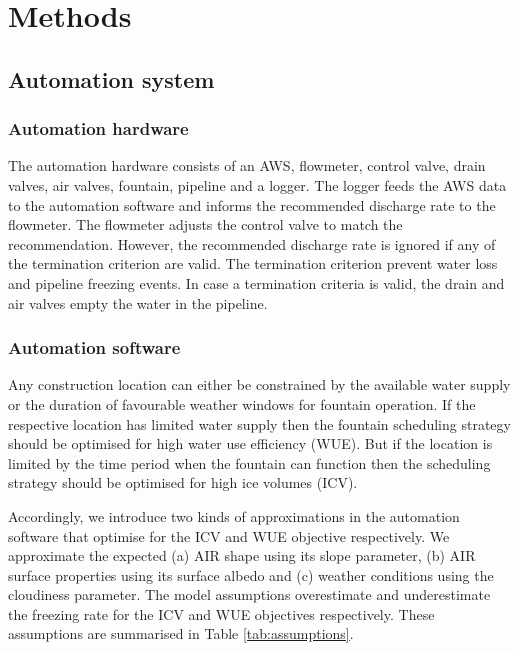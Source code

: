 \documentclass[tc, manuscript]{copernicus}
\begin{document}
\section{Methods}

\subsection{Automation system}

\subsubsection{Automation hardware}

The automation hardware consists of an AWS, flowmeter, control valve, drain valves, air valves, fountain,
pipeline and a logger. The logger feeds the AWS data to the automation software and informs the recommended
discharge rate to the flowmeter. The flowmeter adjusts the control valve to match the recommendation. However,
the recommended discharge rate is ignored if any of the termination criterion are valid. The termination
criterion prevent water loss and pipeline freezing events. In case a termination criteria is valid, the drain
and air valves empty the water in the pipeline.

\subsubsection{Automation software}

Any construction location can either be constrained by the available water supply or the duration of favourable
weather windows for fountain operation. If the respective location has limited water supply then the fountain
scheduling strategy should be optimised for high water use efficiency (WUE). But if the location is limited by
the time period when the fountain can function then the scheduling strategy should be optimised for high ice
volumes (ICV).

Accordingly, we introduce two kinds of approximations in the automation software that optimise for the ICV and
WUE objective respectively. We approximate the expected (a) AIR shape using its slope parameter, (b) AIR surface
properties using its surface albedo and (c) weather conditions using the cloudiness parameter. The model
assumptions overestimate and underestimate the freezing rate for the ICV and WUE objectives respectively. These
assumptions are summarised in Table \ref{tab:assumptions}. 
\end{document}
